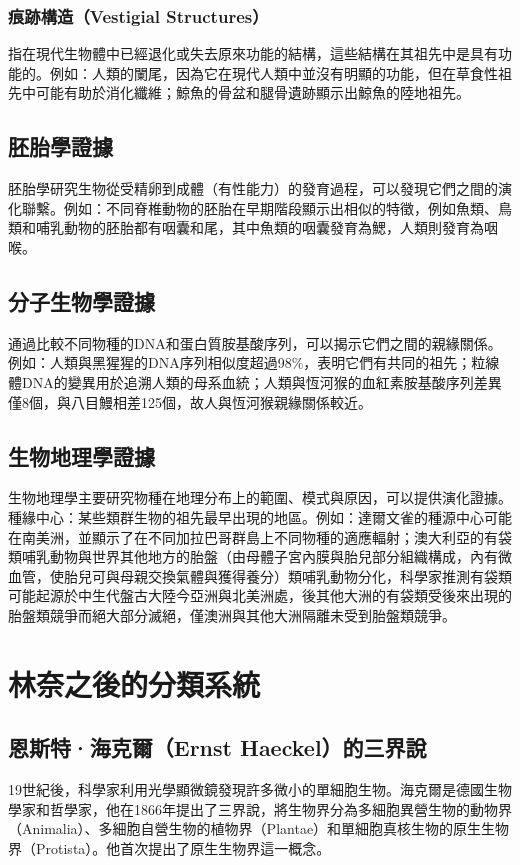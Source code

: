 \documentclass[a4paper,12pt]{report}
\begin{document}
\subsubsection{痕跡構造（Vestigial Structures）}
指在現代生物體中已經退化或失去原來功能的結構，這些結構在其祖先中是具有功能的。例如：人類的闌尾，因為它在現代人類中並沒有明顯的功能，但在草食性祖先中可能有助於消化纖維；鯨魚的骨盆和腿骨遺跡顯示出鯨魚的陸地祖先。
\subsection{胚胎學證據}
胚胎學研究生物從受精卵到成體（有性能力）的發育過程，可以發現它們之間的演化聯繫。例如：不同脊椎動物的胚胎在早期階段顯示出相似的特徵，例如魚類、鳥類和哺乳動物的胚胎都有咽囊和尾，其中魚類的咽囊發育為鰓，人類則發育為咽喉。
\subsection{分子生物學證據}
通過比較不同物種的DNA和蛋白質胺基酸序列，可以揭示它們之間的親緣關係。例如：人類與黑猩猩的DNA序列相似度超過98\%，表明它們有共同的祖先；粒線體DNA的變異用於追溯人類的母系血統；人類與恆河猴的血紅素胺基酸序列差異僅8個，與八目鰻相差125個，故人與恆河猴親緣關係較近。
\subsection{生物地理學證據}
生物地理學主要研究物種在地理分布上的範圍、模式與原因，可以提供演化證據。\\
種緣中心：某些類群生物的祖先最早出現的地區。例如：達爾文雀的種源中心可能在南美洲，並顯示了在不同加拉巴哥群島上不同物種的適應輻射；澳大利亞的有袋類哺乳動物與世界其他地方的胎盤（由母體子宮內膜與胎兒部分組織構成，內有微血管，使胎兒可與母親交換氣體與獲得養分）類哺乳動物分化，科學家推測有袋類可能起源於中生代盤古大陸今亞洲與北美洲處，後其他大洲的有袋類受後來出現的胎盤類競爭而絕大部分滅絕，僅澳洲與其他大洲隔離未受到胎盤類競爭。
\section{林奈之後的分類系統}
\subsection{恩斯特·海克爾（Ernst Haeckel）的三界說}
19世紀後，科學家利用光學顯微鏡發現許多微小的單細胞生物。海克爾是德國生物學家和哲學家，他在1866年提出了三界說，將生物界分為多細胞異營生物的動物界（Animalia）、多細胞自營生物的植物界（Plantae）和單細胞真核生物的原生生物界（Protista）。他首次提出了原生生物界這一概念。
\end{document}
